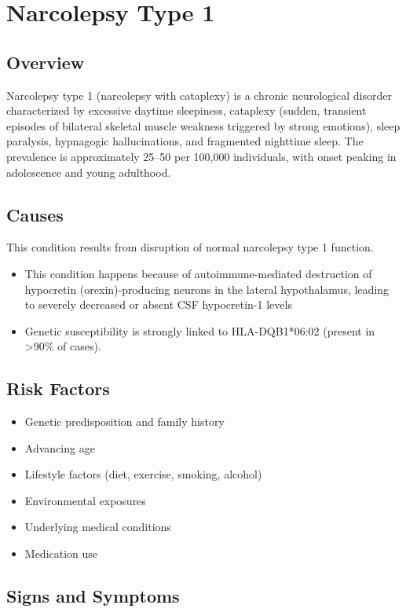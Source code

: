 \chapter{Narcolepsy Type 1}
\label{sec:Narcolepsy Type 1}

\section{Overview}
Narcolepsy type 1 (narcolepsy with cataplexy) is a chronic neurological disorder characterized by excessive daytime sleepiness, cataplexy (sudden, transient episodes of bilateral skeletal muscle weakness triggered by strong emotions), sleep paralysis, hypnagogic hallucinations, and fragmented nighttime sleep. The prevalence is approximately 25--50 per 100,000 individuals, with onset peaking in adolescence and young adulthood.
\section{Causes}
This condition results from disruption of normal narcolepsy type 1 function.

\begin{itemize}[noitemsep]
  \item This condition happens because of autoimmune-mediated destruction of hypocretin (orexin)-producing neurons in the lateral hypothalamus, leading to severely decreased or absent CSF hypocretin-1 levels
  \item Genetic susceptibility is strongly linked to HLA-DQB1*06:02 (present in >90\% of cases).
\end{itemize}
\section{Risk Factors}


\begin{itemize}[noitemsep]
  \item Genetic predisposition and family history
  \item Advancing age
  \item Lifestyle factors (diet, exercise, smoking, alcohol)
  \item Environmental exposures
  \item Underlying medical conditions
  \item Medication use
\end{itemize}
\section{Signs and Symptoms}

